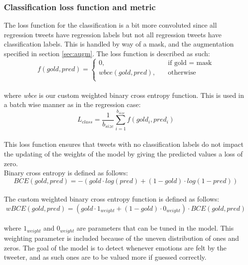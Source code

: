 \subsubsection*{Classification loss function and metric}
The loss function for the classification is a bit more convoluted since all regression tweets have regression labels but not all regression tweets have classification labels. This is handled by way of a mask, and the augmentation specified in section \ref{sec:augm}. The loss function is described as such:\\
\begin{equation}
f(gold,pred) =
     \begin{cases}
       0, &\quad\text{if gold = mask}\\
       wbce(gold,pred), &\quad\text{otherwise} \\
     \end{cases}
\end{equation}\\
where \textit{wbce} is our custom weighted binary cross entropy function. This is used in a batch wise manner as in the regression case:\\
\begin{equation}
L_{class}=\dfrac{1}{b_{size}} \sum_{i=1}^{b_{size}} f(gold_i, pred_i)
\end{equation}\\
 This loss function ensures that tweets with no classification labels do not impact the updating of the weights of the model by giving the predicted values a loss of zero.\\
Binary cross entropy is defined as follows:\\
\begin{equation}
BCE(gold,pred) = -(gold \cdot log(pred)+(1-gold) \cdot log(1-pred))
\end{equation}\\
The custom weighted binary cross entropy function is defined as follows:\\
\begin{equation}
wBCE(gold,pred) = (gold \cdot 1_{weight} + (1-gold) \cdot 0_{weight}) \cdot BCE(gold, pred)
\end{equation}\\
where $1_{weight}$ and $0_{weight}$ are parameters that can be tuned in the model. This weighting parameter is included because of the uneven distribution of ones and zeros. The goal of the model is to detect whenever emotions are felt by the tweeter, and as such ones are to be valued more if guessed correctly. 

